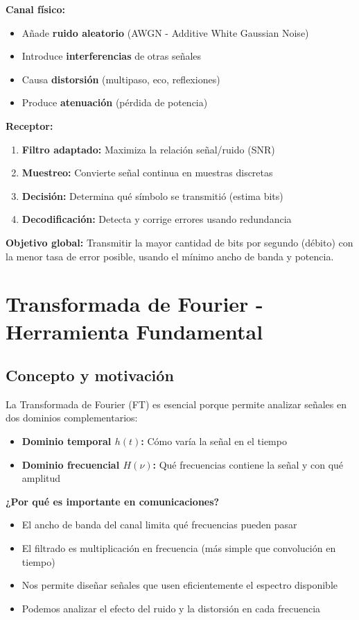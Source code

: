 \documentclass[11pt,a4paper]{article}
\begin{document}
\textbf{Canal físico:}
\begin{itemize}
\item Añade \textbf{ruido aleatorio} (AWGN - Additive White Gaussian Noise)
\item Introduce \textbf{interferencias} de otras señales
\item Causa \textbf{distorsión} (multipaso, eco, reflexiones)
\item Produce \textbf{atenuación} (pérdida de potencia)
\end{itemize}

\textbf{Receptor:}
\begin{enumerate}
\item \textbf{Filtro adaptado:} Maximiza la relación señal/ruido (SNR)
\item \textbf{Muestreo:} Convierte señal continua en muestras discretas
\item \textbf{Decisión:} Determina qué símbolo se transmitió (estima bits)
\item \textbf{Decodificación:} Detecta y corrige errores usando redundancia
\end{enumerate}

\textbf{Objetivo global:} Transmitir la mayor cantidad de bits por segundo (débito) con la menor tasa de error posible, usando el mínimo ancho de banda y potencia.

\newpage

\section{Transformada de Fourier - Herramienta Fundamental}

\subsection{Concepto y motivación}

La Transformada de Fourier (FT) es esencial porque permite analizar señales en dos dominios complementarios:

\begin{itemize}
\item \textbf{Dominio temporal $h(t)$:} Cómo varía la señal en el tiempo
\item \textbf{Dominio frecuencial $H(\nu)$:} Qué frecuencias contiene la señal y con qué amplitud
\end{itemize}

\textbf{¿Por qué es importante en comunicaciones?}
\begin{itemize}
\item El ancho de banda del canal limita qué frecuencias pueden pasar
\item El filtrado es multiplicación en frecuencia (más simple que convolución en tiempo)
\item Nos permite diseñar señales que usen eficientemente el espectro disponible
\item Podemos analizar el efecto del ruido y la distorsión en cada frecuencia
\end{itemize}
\end{document}
